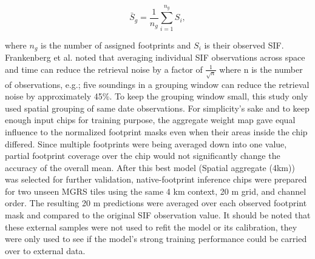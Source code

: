 \begin{equation}
    \bar{S}_g=\frac{1}{n_g}\sum_{i=1}^{n_g}S_i,
    \label{eq:spatial_aggregate_target}
\end{equation}

where $n_g$ is the number of assigned footprints and $S_i$ is their observed SIF. Frankenberg et al. \cite{frankenberg2014prospects} noted that averaging individual SIF observations across space and time can reduce the retrieval noise by a factor of $\frac{1}{\sqrt{n}}$ where n is the number of observations, e.g.; five soundings in a grouping window can reduce the retrieval noise by approximately 45\%. To keep the grouping window small, this study only used spatial grouping of same date observations. For simplicity's sake and to keep enough input chips for training purpose, the aggregate weight map gave equal influence to the normalized footprint masks even when their areas inside the chip differed. Since multiple footprints were being averaged down into one value, partial footprint coverage over the chip would not significantly change the accuracy of the overall mean. After this best model (Spatial aggregate (4km)) was selected for further validation, native-footprint inference chips were prepared for two unseen MGRS tiles using the same 4 km context, 20 m grid, and channel order. The resulting 20 m predictions were averaged over each observed footprint mask and compared to the original SIF observation value. It should be noted that these external samples were not used to refit the model or its calibration, they were only used to see if the model's strong training performance could be carried over to external data.

